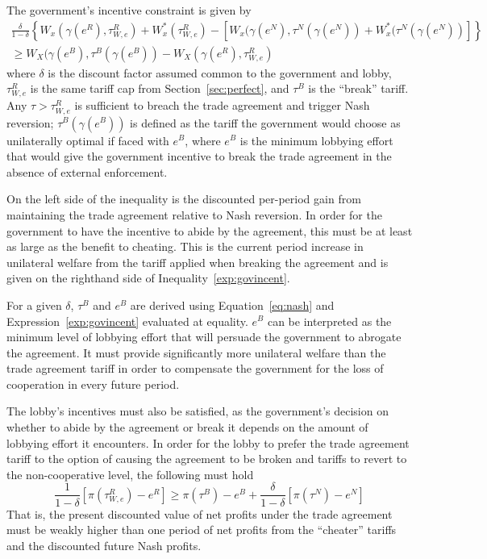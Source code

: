 \documentclass[12pt]{article}
\newcommand{\ga}{\gamma}
\newcommand{\de}{\delta}
\begin{document}
The government's incentive constraint is given by
  \begin{multline}
    \frac{\de}{1-\de} \left\{W_x(\ga(e^R),\tau^R_{W,e}) + W_x^*(\tau^R_{W,e}) - \left[W_x(\ga(e^N),\tau^N(\ga(e^N)) + W_x^*(\tau^N(\ga(e^N)) \right] \right\} \\ \geq W_X(\ga(e^B),\tau^B(\ga(e^B)) - W_X(\ga(e^R),\tau^R_{W,e})
		\label{exp:govincent}
  \end{multline}
where $\de$ is the discount factor assumed common to the government and lobby, $\tau^R_{W,e}$ is the same tariff cap from Section~\ref{sec:perfect}, and $\tau^B$ is the ``break'' tariff. Any $\tau > \tau^R_{W,e}$ is sufficient to breach the trade agreement and trigger Nash reversion; $\tau^B(\ga(e^B))$ is defined as the tariff the government would choose as unilaterally optimal if faced with $e^B$, where $e^B$ is the minimum lobbying effort that would give the government incentive to break the trade agreement in the absence of external enforcement.

On the left side of the inequality is the discounted per-period gain from maintaining the trade agreement relative to Nash reversion. In order for the government to have the incentive to abide by the agreement, this must be at least as large as the benefit to cheating. This is the current period increase in unilateral welfare from the tariff applied when breaking the agreement and is given on the righthand side of Inequality~\ref{exp:govincent}.

For a given $\de$, $\tau^B$ and $e^B$ are derived using Equation~\ref{eq:nash} and Expression~\ref{exp:govincent} evaluated at equality. $e^B$ can be interpreted as the minimum level of lobbying effort that will persuade the government to abrogate the agreement. It must provide significantly more unilateral welfare than the trade agreement tariff in order to compensate the government for the loss of cooperation in every future period.

The lobby's incentives must also be satisfied, as the government's decision on whether to abide by the agreement or break it depends on the amount of lobbying effort it encounters. In order for the lobby to prefer the trade agreement tariff to the option of causing the agreement to be broken and tariffs to revert to the non-cooperative level, the following must hold
\begin{equation}
  \frac{1}{1-\de}\left[\pi(\tau^R_{W,e}) - e^R\right] \geq \pi(\tau^B) - e^B + \frac{\de}{1-\de}\left[\pi(\tau^N) - e^N\right]
	\label{exp:lobby}
\end{equation}
That is, the present discounted value of net profits under the trade agreement must be weakly higher than one period of net profits from the ``cheater'' tariffs and the discounted future Nash profits.
\end{document}
